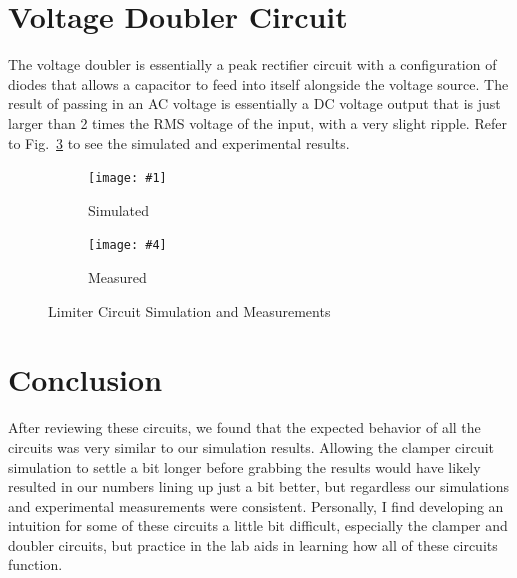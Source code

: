 \documentclass{../../ece-report}
\newcommand{\twosubfigures}[6]{
  \begin{subfigure}{0.45\textwidth}
    \texttt{[image: \#1]}
    \caption{#2}
    \label{#3}
  \end{subfigure}
  \begin{subfigure}{0.45\textwidth}
    \texttt{[image: \#4]}
    \caption{#5}
    \label{#6}
  \end{subfigure}
}
\begin{document}
\section{Voltage Doubler Circuit}

The voltage doubler is essentially a peak rectifier
circuit with a configuration of diodes that allows a
capacitor to feed into itself alongside the voltage
source. The result of passing in an AC voltage is essentially
a DC voltage output that is just larger than 2 times
the RMS voltage of the input, with a very slight ripple.
Refer to Fig.~\ref{fig:doubler_results} to see the simulated
and experimental results.

\begin{figure}[h!]
  \centering
  \twosubfigures{../plots/circuit_d/pdf/d_sim_trans.pdf }{Simulated}{fig:d_simulated}
                {../plots/circuit_d/pdf/d_meas_trans.pdf}{Measured}{fig:d_measured}
  \caption{Limiter Circuit Simulation and Measurements}
  \label{fig:doubler_results}
\end{figure}

\section{Conclusion}

After reviewing these circuits, we found that the expected
behavior of all the circuits was very similar to our
simulation results. Allowing the clamper circuit simulation
to settle a bit longer before grabbing the results would
have likely resulted in our numbers lining up just a
bit better, but regardless our simulations and experimental
measurements were consistent. Personally, I find developing
an intuition for some of these circuits a little bit
difficult, especially the clamper and doubler circuits,
but practice in the lab aids in learning how all of
these circuits function.
\end{document}
